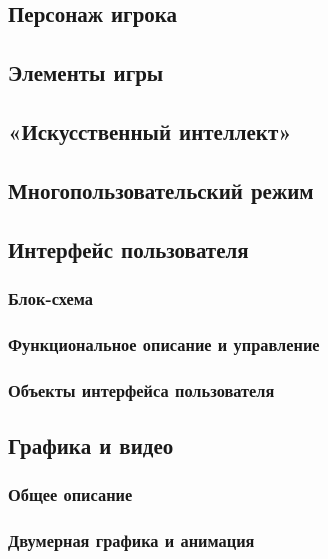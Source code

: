 \documentclass{article}
\begin{document}
	\newpage
	\subsection{Персонаж игрока}
	
	\newpage
	\subsection{Элементы игры}
	
	\newpage
	\subsection{«Искусственный интеллект»}
	
	\newpage
	\subsection{Многопользовательский режим}
	
	\newpage
	\subsection{Интерфейс пользователя}
	
	\subsubsection{Блок-схема}
	
	\subsubsection{Функциональное описание и управление}
	
	\subsubsection{Объекты интерфейса пользователя}
	
	\newpage
	\subsection{Графика и видео}
	
	\subsubsection{Общее описание}
	
	\subsubsection{Двумерная графика и анимация}
	
\end{document}

